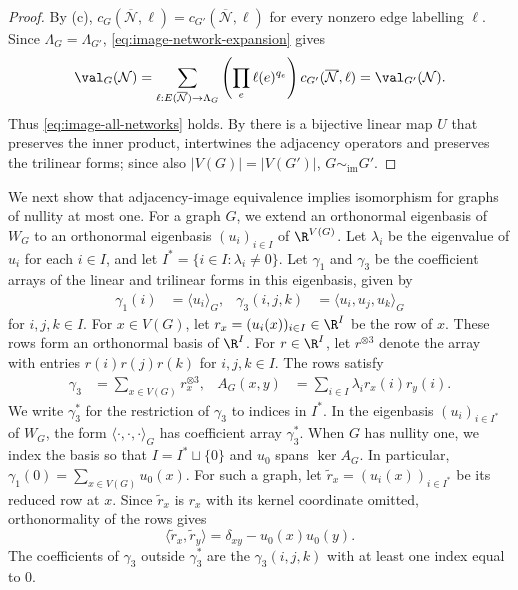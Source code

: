 \begin{proof}
By (c), $c_G(\overline{\mathcal N},\ell)=c_{G'}(\overline{\mathcal N},\ell)$ for every
nonzero edge labelling $\ell$.
Since $\Lambda_G=\Lambda_{G'}$, \cref{eq:image-network-expansion} gives
\begin{equation}\label{eq:image-network-equality}
 \val_G(\mathcal N)
 =\sum_{\ell:E(\overline{\mathcal N})\to\Lambda_G}
 \left(\prod_e\ell(e)^{q_e}\right)c_{G'}(\overline{\mathcal N},\ell)
 =\val_{G'}(\mathcal N).
\end{equation}
Thus \cref{eq:image-all-networks} holds. By \cite[Theorem~9]{Young2025} there
is a bijective linear map $U$ that preserves the inner product,
intertwines the adjacency operators and preserves the trilinear forms;
since also $|V(G)|=|V(G')|$, $G\sim_{\mathrm{im}}G'$.
\end{proof}



We next show that adjacency-image equivalence implies isomorphism for
graphs of nullity at most one.
For a graph $G$, we extend an orthonormal eigenbasis of $W_G$ to an
orthonormal eigenbasis $(u_i)_{i\in I}$ of $\R^{V(G)}$.
Let $\lambda_i$ be the eigenvalue of $u_i$ for each $i\in I$,
and let $I^{*}=\{i\in I:\lambda_i\ne0\}$.
Let $\gamma_1$ and $\gamma_3$ be the coefficient arrays of the
linear and trilinear forms in this eigenbasis, given by
\begin{equation}
  \label{eq:tensors}
  \begin{aligned}
  \gamma_1(i)&=\langle u_i\rangle_G, &
  \gamma_3(i,j,k)&=\langle u_i,u_j,u_k\rangle_G
  \end{aligned}
\end{equation}
for $i,j,k\in I$. For $x\in V(G)$, let $r_x=(u_i(x))_{i\in I}\in\R^I$ be
the row of $x$. These rows form an orthonormal basis of $\R^I$.
For $r\in\R^I$, let $r^{\otimes3}$ denote the array with entries
$r(i)r(j)r(k)$ for $i,j,k\in I$.
The rows satisfy
\begin{equation}
  \label{eq:rows}
  \begin{aligned}
  \gamma_3 &= \sum_{x \in V(G)} r_x^{\otimes 3}, &
  A_G(x,y) &= \sum_{i \in I} \lambda_i r_x(i) r_y(i).
  \end{aligned}
\end{equation}
We write $\gamma_3^{*}$ for the restriction of $\gamma_3$ to
indices in $I^{*}$.
In the eigenbasis $(u_i)_{i\in I^*}$ of $W_G$, the form
$\langle\cdot,\cdot,\cdot\rangle_G$ has coefficient array $\gamma_3^*$.
When $G$ has nullity one, we index the basis so that $I=I^*\sqcup\{0\}$
and $u_0$ spans $\ker A_G$.
In particular, $\gamma_1(0)=\sum_{x\in V(G)}u_0(x)$.
For such a graph, let $\tilde{r}_x=(u_i(x))_{i\in I^*}$ be
its reduced row at $x$.
Since $\tilde{r}_x$ is $r_x$ with its kernel coordinate omitted,
orthonormality of the rows gives
\begin{equation}\label{eq:gram}
 \langle\tilde{r}_x,\tilde{r}_y\rangle=\delta_{xy}-u_0(x)u_0(y).
\end{equation}
The coefficients of $\gamma_3$ outside
$\gamma_3^*$ are the $\gamma_3(i,j,k)$ with at least one
index equal to $0$.


